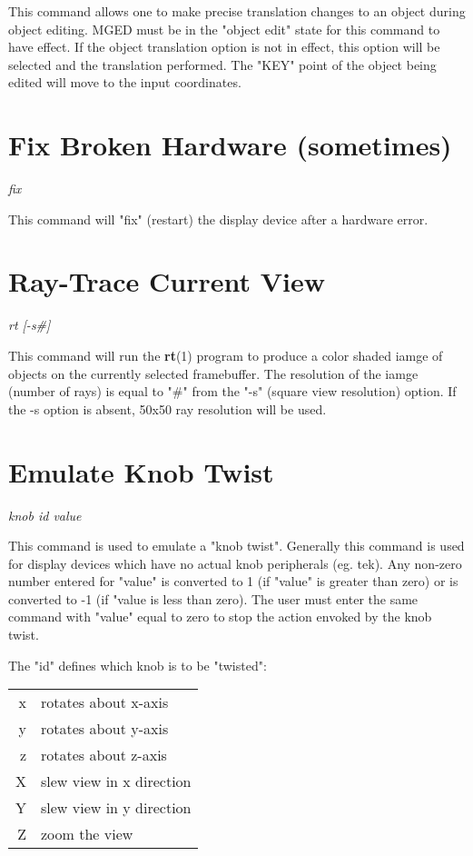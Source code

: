 This command allows one to make precise translation changes to an object
during object editing.
MGED must be in the "object edit" state for this command to have effect.
If the object translation option is not in effect, this option will be
selected and the translation performed.
The "KEY" point of the object being edited will move to the input coordinates.

\section{Fix Broken Hardware (sometimes)}

{\em \center
fix
}

This command will "fix" (restart) the display device after a hardware error.

\section{Ray-Trace Current View}

{\em \center
rt [-s\#]
}

This command will run the {\bf rt}(1) program
to produce a color shaded iamge of objects on the currently
selected framebuffer.
The resolution of the iamge (number of rays) is equal to "\#" from the "-s"
(square view resolution) option.
If the -s option is absent, 50x50 ray resolution will be used.

\section{Emulate Knob Twist}

{\em \center
knob id value
}

This command is used to emulate a "knob twist".
Generally this command is used for display devices which have no actual
knob peripherals (eg. tek).
Any non-zero number entered for "value" is converted to 1 (if "value" is
greater than zero) or is converted to -1 (if "value is less than zero).
The user must enter the same command with "value" equal to zero to
stop the action envoked by the knob twist.

The "id" defines which knob is to be "twisted":

\begin{tabular}{rl}
	x	& rotates about x-axis \\
	y	& rotates about y-axis \\
	z	& rotates about z-axis \\
	X	& slew view in x direction \\
	Y	& slew view in y direction \\
	Z	& zoom the view \\
\end{tabular}

